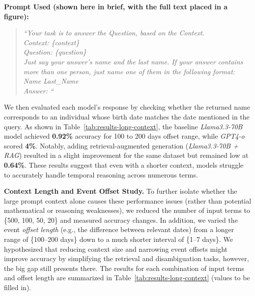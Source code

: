 \documentclass[11pt]{article}
\begin{document}
\noindent\textbf{Prompt Used (shown here in brief, with the full text placed in a figure):}
\begin{quote}
\emph{``Your task is to answer the Question, based on the Context.\\
Context: \{context\}\\
Question:  \{question\}\\
Just say your answer's name and the last name. If your answer contains more than one person, just name one of them in the following format:\\
Name Last\_Name\\
Answer: ``}
\end{quote}

We then evaluated each model’s response by checking whether the returned name corresponds to an individual whose birth date matches the date mentioned in the query. As shown in Table~\ref{tab:results-long-context}, the baseline \emph{Llama3.3-70B} model achieved \textbf{0.92\%} accuracy for 100 to 200 days offset range, while \emph{GPT4-o} scored \textbf{4\%}. Notably, adding retrieval-augmented generation (\emph{Llama3.3-70B + RAG}) resulted in a slight improvement for the same dataset but remained low at \textbf{0.64\%}. These results suggest that even with a shorter context, models struggle to accurately handle temporal reasoning across numerous terms.


\noindent
\textbf{Context Length and Event Offset Study.}
To further isolate whether the large prompt context alone causes these performance issues (rather than potential mathematical or reasoning weaknesses), we reduced the number of input terms to \{500, 100, 50, 20\} and measured accuracy changes. In addition, we varied the event \emph{offset length} (e.g., the difference between relevant dates) from a longer range of \{100--200 days\} down to a much shorter interval of \{1--7 days\}. We hypothesized that reducing context size and narrowing event offsets might improve accuracy by simplifying the retrieval and disambiguation tasks, however, the big gap still presents there. The results for each combination of input terms and offset length are summarized in Table~\ref{tab:results-long-context} (values to be filled in).
\end{document}
